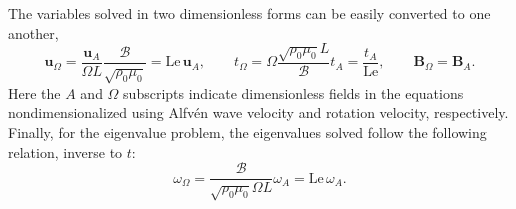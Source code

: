 The variables solved in two dimensionless forms can be easily converted to one another,
\[
    \mathbf{u}_\Omega = \frac{\mathbf{u}_A}{\Omega L} \frac{\mathscr{B}}{\sqrt{\rho_0 \mu_0}} = \mathrm{Le} \, \mathbf{u}_A, \qquad t_\Omega = \Omega \frac{\sqrt{\rho_0 \mu_0} L}{\mathscr{B}} t_A = \frac{t_A}{\mathrm{Le}},\qquad \mathbf{B}_\Omega = \mathbf{B}_A.
\]
Here the $A$ and $\Omega$ subscripts indicate dimensionless fields in the equations nondimensionalized using Alfvén wave velocity and rotation velocity, respectively. Finally, for the eigenvalue problem, the eigenvalues solved follow the following relation, inverse to $t$:
\[
    \omega_\Omega = \frac{\mathscr{B}}{\sqrt{\rho_0 \mu_0} \Omega L} \omega_A = \mathrm{Le} \, \omega_A.
\]
